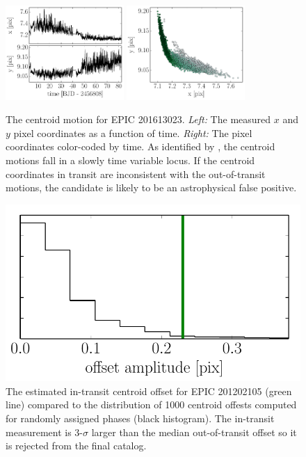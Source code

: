 \documentclass[12pt,preprint]{aastex}
\newcommand{\figlabel}[1]{\label{fig:#1}}
\begin{document}
\begin{figure}[p]
\begin{center}
\includegraphics[width=0.4\textwidth]{figures/centroid.pdf}
\includegraphics[width=0.4\textwidth]{figures/centroid-2.pdf}
\end{center}
\caption{%
The centroid motion for EPIC 201613023.
\emph{Left:} The measured $x$ and $y$ pixel coordinates as a function of time.
\emph{Right:} The pixel coordinates color-coded by time.
As identified by \citet{Vanderburg:2014}, the centroid motions fall in a
slowly time variable locus.
If the centroid coordinates in transit are inconsistent with the
out-of-transit motions, the candidate is likely to be an astrophysical false
positive.
\figlabel{centroid}}
\end{figure}

\begin{figure}[p]
\begin{center}
\includegraphics{figures/offsets.pdf}
\end{center}
\caption{%
The estimated in-transit centroid offset for EPIC 201202105 (green line)
compared to the distribution of 1000 centroid offests computed for randomly
assigned phases (black histogram).
The in-transit measurement is 3-$\sigma$ larger than the median out-of-transit
offset so it is rejected from the final catalog.
\figlabel{offsets}}
\end{figure}
\end{document}
